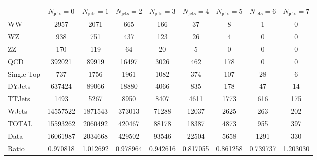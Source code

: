 \footnotesize{
\begin{tabular}{l|cccccccc} 
  &  $N_{\text{jets}} = 0 $ & $N_{\text{jets}} = 1 $ & $N_{\text{jets}} = 2 $ & $N_{\text{jets}} = 3 $ & $N_{\text{jets}} = 4 $ & $N_{\text{jets}} = 5 $ & $N_{\text{jets}} = 6 $ & $N_{\text{jets}} = 7$ \\ \hline 
   WW        & 2957 & 2071 & 665 & 166 & 37 & 8 & 1 & 0 \\ 
   WZ        & 938 & 751 & 437 & 123 & 26 & 4 & 0 & 0 \\ 
   ZZ        & 170 & 119 & 64 & 20 & 5 & 0 & 0 & 0 \\ 
   QCD        & 392021 & 89919 & 16497 & 3026 & 462 & 178 & 0 & 0 \\ 
   Single Top        & 737 & 1756 & 1961 & 1082 & 374 & 107 & 28 & 6 \\ 
   DYJets        & 637424 & 89066 & 18880 & 4066 & 835 & 178 & 47 & 14 \\ 
   TTJets        & 1493 & 5267 & 8950 & 8407 & 4611 & 1773 & 616 & 175 \\ 
   WJets        & 14557522 & 1871543 & 373013 & 71288 & 12037 & 2625 & 263 & 202 \\ 
 \hline 
 TOTAL & 15593262 & 2060492 & 420467 & 88178 & 18387 & 4873 & 955 & 397 \\ 
 \hline 
 Data          & 16061987 & 2034668 & 429502 & 93546 & 22504 & 5658 & 1291 & 330 \\ 
  Ratio          & 0.970818 & 1.012692 & 0.978964 & 0.942616 & 0.817055 & 0.861258 & 0.739737 & 1.203030 \\ 
 \end{tabular}}